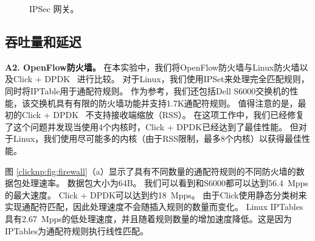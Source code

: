 \begin{figure}[htbp]
		\centering
		
		\caption{IPSec 网关。}
		
		\label{clicknp:fig:IPSec}
\end{figure}

\subsection{吞吐量和延迟}


\textbf {A2. OpenFlow防火墙。}
在本实验中，我们将OpenFlow防火墙与Linux防火墙以及Click + DPDK~ \cite {barbette2015fast}进行比较。
对于Linux，我们使用IPSet来处理完全匹配规则，同时将IPTable用于通配符规则。
作为参考，我们还包括Dell S6000交换机的性能，该交换机具有有限的防火墙功能并支持1.7K通配符规则。
值得注意的是，最初的Click + DPDK~ \cite {barbette2015fast}不支持接收端缩放（RSS）。
在这项工作中，我们已经修复了这个问题并发现当使用4个内核时，Click + DPDK已经达到了最佳性能。
但对于Linux，我们使用尽可能多的内核（由于RSS限制，最多8个内核）以获得最佳性能。

图 \ref {clicknp:fig:firewall}（a）显示了具有不同数量的通配符规则的不同防火墙的数据包处理速率。
数据包大小为64B。
我们可以看到\name 和S6000都可以达到56.4~Mpps的最大速度。
Click + DPDK可以达到约18~Mpps。
由于Click使用静态分类树来实现通配符匹配，因此处理速度不会随插入规则的数量而变化。
Linux IPTables具有2.67~Mpps的低处理速度，并且随着规则数量的增加速度降低。这是因为IPTables为通配符规则执行线性匹配。

